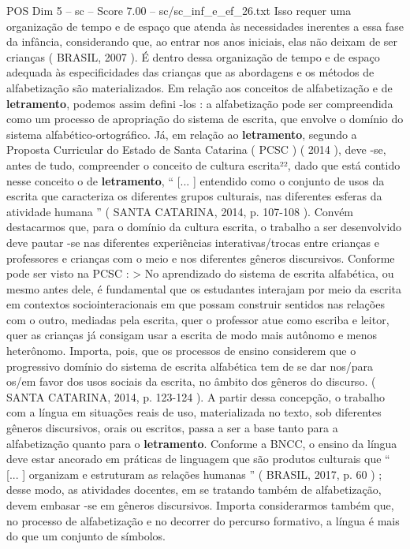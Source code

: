 \begin{textsample}{POS Dim 5 – sc – Score 7.00 – sc/sc\_inf\_e\_ef\_26.txt}
Isso requer uma organização de tempo e de espaço que atenda às necessidades inerentes a essa fase da infância, considerando que, ao entrar nos anos iniciais, elas não deixam de ser crianças ( BRASIL, 2007 ).
É dentro dessa organização de tempo e de espaço adequada às especificidades das crianças que as abordagens e os métodos de alfabetização são materializados.
Em relação aos conceitos de alfabetização e de \textbf{letramento}, podemos assim defini -los : a alfabetização pode ser compreendida como um processo de apropriação do sistema de escrita, que envolve o domínio do sistema alfabético-ortográfico.
Já, em relação ao \textbf{letramento}, segundo a Proposta Curricular do Estado de Santa Catarina ( PCSC ) ( 2014 ), deve -se, antes de tudo, compreender o conceito de cultura escrita²², dado que está contido nesse conceito o de \textbf{letramento}, “ [... ] entendido como o conjunto de usos da escrita que caracteriza os diferentes grupos culturais, nas diferentes esferas da atividade humana ” ( SANTA CATARINA, 2014, p. 107-108 ).
Convém destacarmos que, para o domínio da cultura escrita, o trabalho a ser desenvolvido deve pautar -se nas diferentes experiências interativas/trocas entre crianças e professores e crianças com o meio e nos diferentes gêneros discursivos.
Conforme pode ser visto na PCSC : > No aprendizado do sistema de escrita alfabética, ou mesmo antes dele, é fundamental que os estudantes interajam por meio da escrita em contextos sociointeracionais em que possam construir sentidos nas relações com o outro, mediadas pela escrita, quer o professor atue como escriba e leitor, quer as crianças já consigam usar a escrita de modo mais autônomo e menos heterônomo.
Importa, pois, que os processos de ensino considerem que o progressivo domínio do sistema de escrita alfabética tem de se dar nos/para os/em favor dos usos sociais da escrita, no âmbito dos gêneros do discurso. ( SANTA CATARINA, 2014, p. 123-124 ).
A partir dessa concepção, o trabalho com a língua em situações reais de uso, materializada no texto, sob diferentes gêneros discursivos, orais ou escritos, passa a ser a base tanto para a alfabetização quanto para o \textbf{letramento}.
Conforme a BNCC, o ensino da língua deve estar ancorado em práticas de linguagem que são produtos culturais que “ [... ] organizam e estruturam as relações humanas ” ( BRASIL, 2017, p. 60 ) ; desse modo, as atividades docentes, em se tratando também de alfabetização, devem embasar -se em gêneros discursivos.
Importa considerarmos também que, no processo de alfabetização e no decorrer do percurso formativo, a língua é mais do que um conjunto de símbolos.

\end{textsample}
